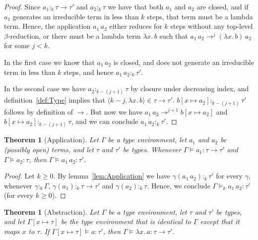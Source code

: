\documentclass[12pt,a4paper,draft]{article}
\theoremstyle{definition}
\theoremstyle{plain}
\newtheorem{theorem}[definition]{Theorem}
\newcommand{\abstr}[2]{\ensuremath{\lambda{#1}.\,{#2}}}
\newcommand{\app}[2]{\ensuremath{{#1}\,{#2}}}
\newcommand{\pair}[1]{\ensuremath{\langle{#1}\rangle}}
\begin{document}
\begin{proof}
  Since $a_1 :_k \tau \to \tau'$ and $a_2 :_k \tau$ we have that both $a_1$ and $a_2$ are closed,
  and if $a_1$ generates an irreducible term in less than $k$ steps, that term must be a lambda
  term. Hence, the application $\app{a_1}{a_2}$ either reduces for $k$ steps without any top-level
  $\beta$-reduction, or there must be a lambda term $\abstr{x}{b}$ such that
  $\app{a_1}{a_2} \to^j \app{(\abstr{x}{b})}{a_2}$ for some $j < k$.

  In the first case we know that $\app{a_1}{a_2}$ is closed, and does not generate an irreducible
  term in less than $k$ steps, and hence $\app{a_1}{a_2} :_k \tau'$.

  In the second case we have $a_2 :_{k-(j+1)} \tau$ by closure under decreasing index, and
  definition~\ref{def:Type} implies that $\pair{k-j,\abstr{x}{b}} \in \tau \to \tau'$.
  $b[x \mapsto a_2] :_{k-(j+1)} \tau'$ follows by definition of $\to$. But now we have
  $\app{a_1}{a_2} \to^{j+1} b[x \mapsto a_2]$ and $b[x \mapsto a_2] :_{k-(j+1)} \tau$, and
  we can conclude $\app{a_1}{a_2} :_k \tau'$.
\end{proof}

\begin{theorem}[Application] \label{thm:Application}
  Let $\Gamma$ be a type environment, let $a_1$ and $a_2$ be (possibly open) terms, and let
  $\tau$ and $\tau'$ be types. Whenever $\Gamma \models a_1 : \tau \to \tau'$ and $\Gamma \models a_2 : \tau$,
  then $\Gamma \models \app{a_1}{a_2} : \tau'$.
\end{theorem}

\begin{proof}
  Let $k \ge 0$. By lemma~\ref{lem:Application} we have
  $\gamma(\app{a_1}{a_2}) :_k \tau'$ for every $\gamma$, whenever $\gamma :_k \Gamma$,
  $\gamma(a_1) :_k \tau \to \tau'$ and $\gamma(a_2) :_k \tau$. Hence, we conclude
  $\Gamma \models_k \app{a_1}{a_2} : \tau'$ (for every $k \ge 0$).
\end{proof}

\begin{theorem}[Abstraction] \label{thm:Abstraction}
  Let $\Gamma$ be a type environment, let $\tau$ and $\tau'$ be types, and let $\Gamma[x \mapsto \tau]$
  be the type environment that is identical to $\Gamma$ except that it maps $x$ to $\tau$. If
  $\Gamma[x \mapsto \tau] \models a : \tau'$, then $\Gamma \models \abstr{x}{a} : \tau \to \tau'$.
\end{theorem}
\end{document}
